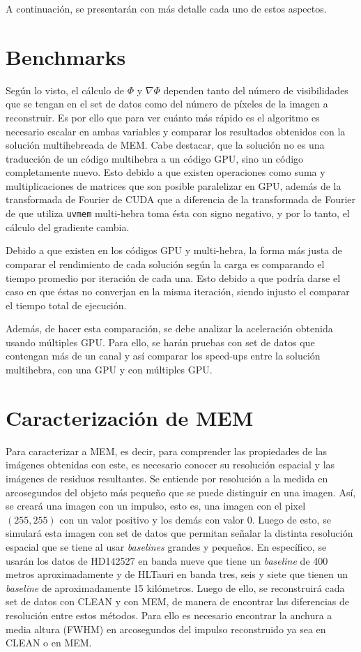 A continuación, se presentarán con más detalle cada uno de estos aspectos.

\section{Benchmarks}
Según lo visto, el cálculo de $\Phi$ y $\nabla \Phi$ dependen tanto del número de visibilidades que se tengan en el set de datos como del número de píxeles de la imagen a reconstruir. Es por ello que para ver cuánto más rápido es el algoritmo es necesario escalar en ambas variables y comparar los resultados obtenidos con la solución multihebreada de MEM. Cabe destacar, que la solución no es una traducción de un código multihebra a un código GPU, sino un código completamente nuevo. Esto debido a que existen operaciones como suma y multiplicaciones de matrices que son posible paralelizar en GPU, además de la transformada de Fourier de CUDA \citep{cudafft} que a diferencia de la transformada de Fourier de \citep{numericalrecipes} que utiliza \texttt{uvmem} multi-hebra toma ésta con signo negativo, y por lo tanto, el cálculo del gradiente cambia.

Debido a que existen en los códigos GPU y multi-hebra, la forma más justa de comparar el rendimiento de cada solución según la carga es comparando el tiempo promedio por iteración de cada una. Esto debido a que podría darse el caso en que éstas no converjan en la misma iteración, siendo injusto el comparar el tiempo total de ejecución.

Además, de hacer esta comparación, se debe analizar la aceleración obtenida usando múltiples GPU. Para ello, se harán pruebas con set de datos que contengan más de un canal y así comparar los speed-ups entre la solución multihebra, con una GPU y con múltiples GPU.

\section{Caracterización de MEM}

Para caracterizar a MEM, es decir, para comprender las propiedades de las imágenes obtenidas con este, es necesario conocer su resolución espacial y las imágenes de residuos resultantes. Se entiende por resolución a la medida en arcosegundos del objeto más pequeño que se puede distinguir en una imagen. Así, se creará una imagen con un impulso, esto es, una imagen con el pixel $(255,255)$ con un valor positivo y los demás con valor 0. Luego de esto, se simulará esta imagen con set de datos que permitan señalar la distinta resolución espacial que se tiene al usar \textit{baselines} grandes y pequeños. En específico, se usarán los datos de HD142527 en banda nueve que tiene un \textit{baseline} de 400 metros aproximadamente y de HLTauri en banda tres, seis y siete que tienen un \textit{baseline} de aproximadamente 15 kilómetros. Luego de ello, se reconstruirá cada set de datos con CLEAN y con MEM, de manera de encontrar las diferencias de resolución entre estos métodos. Para ello es necesario encontrar la anchura a media altura (FWHM) en arcosegundos del impulso reconstruido ya sea en CLEAN o en MEM.


